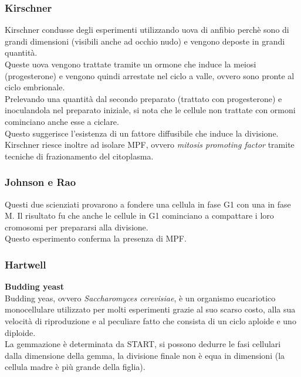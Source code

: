         \subsubsection{Kirschner}
            Kirschner condusse degli esperimenti utilizzando uova di anfibio perchè sono di grandi dimensioni (visibili anche ad occhio nudo) e vengono deposte in grandi quantità.\\
            Queste uova vengono trattate tramite un ormone che induce la meiosi (progesterone) e vengono quindi arrestate nel ciclo a valle, ovvero sono pronte al ciclo embrionale. \\
            Prelevando una quantità dal secondo preparato (trattato con progesterone) e inoculandola nel preparato iniziale, si nota che le cellule non trattate con ormoni cominciano anche esse a ciclare. \\
            Questo suggerisce l'esistenza di un fattore diffusibile che induce la divisione. \\
            Kirschner riesce inoltre ad isolare MPF, ovvero \textit{mitosis promoting factor} tramite tecniche di frazionamento del citoplasma.
        
        \subsubsection{Johnson e Rao}
            Questi due scienziati provarono a fondere una cellula in fase G1 con una in fase M. Il risultato fu che anche le cellule in G1 cominciano a compattare i loro cromosomi per prepararsi alla divisione. \\
            Questo esperimento conferma la presenza di MPF.
        
        \subsubsection{Hartwell}
            \textbf{Budding yeast}\\
                Budding yeas, ovvero \textit{Saccharomyces cerevisiae}, è un organismo eucariotico monocellulare utilizzato per molti esperimenti grazie al suo scarso costo, alla sua velocità di riproduzione e al peculiare fatto che consista di un ciclo aploide e uno diploide.\\
                La gemmazione è determinata da START, si possono dedurre le fasi cellulari dalla dimensione della gemma, la divisione finale non è equa in dimensioni (la cellula madre è più grande della figlia).\\
                
